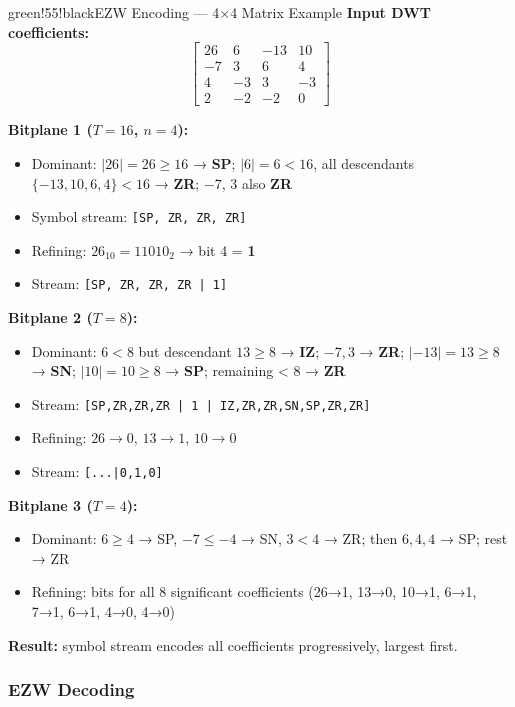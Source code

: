 \begin{calloutbox}{green!55!black}{EZW Encoding — 4×4 Matrix Example}
\textbf{Input DWT coefficients:}
\[
\begin{bmatrix} 26 & 6 & -13 & 10 \\ -7 & 3 & 6 & 4 \\ 4 & -3 & 3 & -3 \\ 2 & -2 & -2 & 0 \end{bmatrix}
\]

\textbf{Bitplane 1 ($T=16$, $n=4$):}
\begin{itemize}
\item Dominant: $|26|=26 \geq 16$ → \textbf{SP}; $|6|=6 < 16$, all descendants $\{-13, 10, 6, 4\} < 16$ → \textbf{ZR}; $-7$, $3$ also \textbf{ZR}
\item Symbol stream: \texttt{[SP, ZR, ZR, ZR]}
\item Refining: $26_{10} = 11010_2$ → bit 4 = \textbf{1}
\item Stream: \texttt{[SP, ZR, ZR, ZR | 1]}
\end{itemize}

\textbf{Bitplane 2 ($T=8$):}
\begin{itemize}
\item Dominant: $6 < 8$ but descendant $13 \geq 8$ → \textbf{IZ}; $-7, 3$ → \textbf{ZR}; $|-13|=13 \geq 8$ → \textbf{SN}; $|10|=10 \geq 8$ → \textbf{SP}; remaining \textless{} 8 → \textbf{ZR}
\item Stream: \texttt{[SP,ZR,ZR,ZR | 1 | IZ,ZR,ZR,SN,SP,ZR,ZR]}
\item Refining: $26 \to 0$, $13 \to 1$, $10 \to 0$
\item Stream: \texttt{[...|0,1,0]}
\end{itemize}

\textbf{Bitplane 3 ($T=4$):}
\begin{itemize}
\item Dominant: $6 \geq 4$ → SP, $-7 \leq -4$ → SN, $3 < 4$ → ZR; then $6,4,4$ → SP; rest → ZR
\item Refining: bits for all 8 significant coefficients (26→1, 13→0, 10→1, 6→1, 7→1, 6→1, 4→0, 4→0)
\end{itemize}

\textbf{Result:} symbol stream encodes all coefficients progressively, largest first.
\end{calloutbox}

\subsubsection{EZW Decoding}

